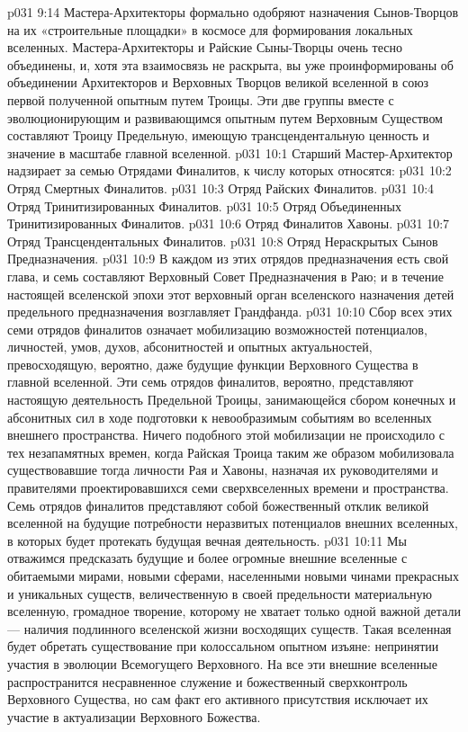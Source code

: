 \vs p031 9:14 Мастера\hyp{}Архитекторы формально одобряют назначения Сынов\hyp{}Творцов на их «строительные площадки» в космосе для формирования локальных вселенных. Мастера\hyp{}Архитекторы и Райские Сыны\hyp{}Творцы очень тесно объединены, и, хотя эта взаимосвязь не раскрыта, вы уже проинформированы об объединении Архитекторов и Верховных Творцов великой вселенной в союз первой полученной опытным путем Троицы. Эти две группы вместе с эволюционирующим и развивающимся опытным путем Верховным Существом составляют Троицу Предельную, имеющую трансцендентальную ценность и значение в масштабе главной вселенной.
\vs p031 10:1 Старший Мастер\hyp{}Архитектор надзирает за семью Отрядами Финалитов, к числу которых относятся:
\vs p031 10:2 \bibnobreakspace Отряд Смертных Финалитов.
\vs p031 10:3 \bibnobreakspace Отряд Райских Финалитов.
\vs p031 10:4 \bibnobreakspace Отряд Тринитизированных Финалитов.
\vs p031 10:5 \bibnobreakspace Отряд Объединенных Тринитизированных Финалитов.
\vs p031 10:6 \bibnobreakspace Отряд Финалитов Хавоны.
\vs p031 10:7 \bibnobreakspace Отряд Трансцендентальных Финалитов.
\vs p031 10:8 \bibnobreakspace Отряд Нераскрытых Сынов Предназначения.
\vs p031 10:9 В каждом из этих отрядов предназначения есть свой глава, и семь составляют Верховный Совет Предназначения в Раю; и в течение настоящей вселенской эпохи этот верховный орган вселенского назначения детей предельного предназначения возглавляет Грандфанда.
\vs p031 10:10 Сбор всех этих семи отрядов финалитов означает мобилизацию возможностей потенциалов, личностей, умов, духов, абсонитностей и опытных актуальностей, превосходящую, вероятно, даже будущие функции Верховного Существа в главной вселенной. Эти семь отрядов финалитов, вероятно, представляют настоящую деятельность Предельной Троицы, занимающейся сбором конечных и абсонитных сил в ходе подготовки к невообразимым событиям во вселенных внешнего пространства. Ничего подобного этой мобилизации не происходило с тех незапамятных времен, когда Райская Троица таким же образом мобилизовала существовавшие тогда личности Рая и Хавоны, назначая их руководителями и правителями проектировавшихся семи сверхвселенных времени и пространства. Семь отрядов финалитов представляют собой божественный отклик великой вселенной на будущие потребности неразвитых потенциалов внешних вселенных, в которых будет протекать будущая вечная деятельность.
\vs p031 10:11 Мы отважимся предсказать будущие и более огромные внешние вселенные с обитаемыми мирами, новыми сферами, населенными новыми чинами прекрасных и уникальных существ, величественную в своей предельности материальную вселенную, громадное творение, которому не хватает только одной важной детали --- наличия подлинного  вселенской жизни восходящих существ. Такая вселенная будет обретать существование при колоссальном опытном изъяне: непринятии участия в эволюции Всемогущего Верховного. На все эти внешние вселенные распространится несравненное служение и божественный сверхконтроль Верховного Существа, но сам факт его активного присутствия исключает их участие в актуализации Верховного Божества.
